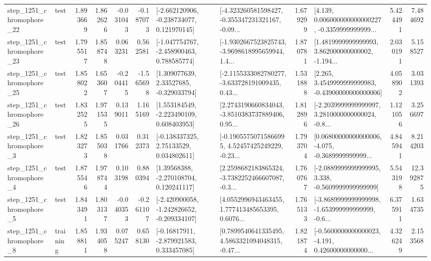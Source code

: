 \begin{tabular}{llrrrrllrlrr}
 step\_1251\_chromophore\_22 &      test &      1.893669 &    1.862626 &     -0.031043 & -0.187073 &   [-2.662120906, -0.238734077, 0.121970145] &  [-4.323260581598427, -0.355347231321167, -0.09... &       1.679299 &  [4.139, 0.006000000000000227, -0.3359999999999... &            5.424491 &          7.484692 \\
 step\_1251\_chromophore\_23 &      test &      1.795517 &    1.858748 &      0.063231 &  0.562581 &   [-1.047754767, -2.458900463, 0.788585774] &  [-1.9302667523825743, -3.9698618995659944, 1.4... &       1.870781 &  [1.4819999999999993, 3.862000000000002, -1.194... &            2.030191 &          5.158527 \\
 step\_1251\_chromophore\_25 &      test &      1.858022 &    1.653607 &     -0.204415 & -1.565698 &     [1.309077639, 2.33527685, -0.329033794] &  [-2.1155333082780277, -3.633728191009435, 0.43... &       1.531888 &  [2.265, 3.4549999999999983, -0.43900000000000006] &            4.058902 &          3.031393 \\
 step\_1251\_chromophore\_26 &      test &      1.832525 &    1.971535 &      0.139011 &  1.165169 &    [1.553184549, -2.223490109, 0.608403953] &  [2.2743190660834043, -3.8510383737889406, 0.95... &       1.812896 &  [-2.2039999999999997, 3.2810000000000024, -0.8... &            1.121056 &          3.256697 \\
  step\_1251\_chromophore\_3 &      test &      1.823273 &    1.855038 &      0.031766 &  0.312373 &     [-0.138337325, 2.75133529, 0.034802611] &  [-0.19055750715866995, 4.52457425249229, -0.23... &       1.793704 &  [0.06800000000000006, -4.075, -0.3689999999999... &            4.845941 &          8.214203 \\
  step\_1251\_chromophore\_4 &      test &      1.875546 &    1.978744 &      0.103198 &  0.880394 &     [1.39568388, -2.270108704, 0.120241117] &  [2.2598682183865324, -3.7382252466607087, -0.3... &       1.760767 &  [-2.0889999999999995, 3.338, -0.5609999999999999] &            5.543198 &         12.392875 \\
  step\_1251\_chromophore\_5 &      test &      1.843491 &    1.803137 &     -0.040353 & -0.261107 &  [-2.420900058, -1.242826652, -0.209334107] &  [4.0552996943463455, 1.777413485653395, 0.6076... &       1.765133 &  [-3.8689999999999998, -1.653999999999999, -0.6... &            6.375911 &          1.634735 \\
  step\_1251\_chromophore\_8 &  training &      1.858811 &    1.934058 &      0.075247 &  0.658130 &    [-0.16817911, -2.879921583, 0.333457085] &  [0.7899540641335495, 4.5863321094048315, -0.47... &       1.821874 &  [-0.5600000000000023, -4.191, 0.42600000000000... &            4.326249 &          2.153568 \\

\end{tabular}
